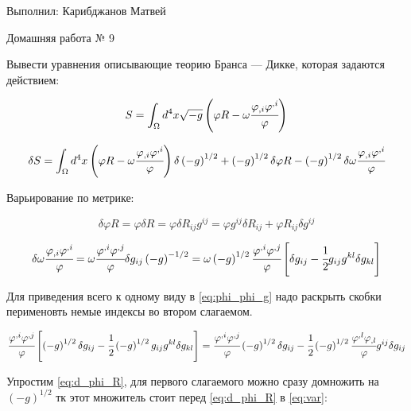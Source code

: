 \documentclass[a4paper]{article}
\newcommand{\inner}[1]{\left( #1 \right)}
\newcommand{\insqr}[1]{\left[ #1 \right]}
\renewcommand{\phi}{\varphi}
\numberwithin{equation}{section}
\begin{document}
\begin{flushright}
    Выполнил:
    Карибджанов Матвей

    Домашняя работа № 9
\end{flushright}
\pagestyle{main}

Вывести уравнения описывающие теорию Бранса — Дикке, которая задаются действием:

\begin{eqnarray}
    S = \int_\Omega d^4 x \sqrt{-g} \inner{\phi R - \omega \cfrac{\phi_{,i}\phi^{,i}}{\phi}} 
\end{eqnarray}

\begin{eqnarray}
    \label{eq:var}
    \delta S = \int_\Omega d^4 x \inner{\phi R - \omega \cfrac{\phi_{,i}\phi^{,i}}{\phi}}  \delta \inner{-g}^{1/2}
    + \inner{-g}^{1/2} \delta \phi R 
    - \inner{-g}^{1/2} \delta\omega \cfrac{\phi_{,i}\phi^{,i}}{\phi}
\end{eqnarray}

Варьирование по метрике:

\begin{equation}
    \label{eq:d_phi_R}
    \delta \phi R = \phi \delta R = \phi \delta R_{ij} g^{ij} 
    = \phi g^{ij} \delta R_{ij}  + \phi R_{ij} \delta g^{ij}
\end{equation}

\begin{equation}
    \label{eq:phi_phi_g}
    \delta\omega \cfrac{\phi_{,i}\phi^{,i}}{\phi} 
    = \omega \cfrac{\phi^{,i}\phi^{,j}}{\phi} \delta g_{ij} \inner{-g}^{-1/2}
    = \omega \inner{-g}^{1/2} \cfrac{\phi^{,i}\phi^{,j}}{\phi} \insqr{ \delta g_{ij} 
    - \cfrac{1}{2} g_{ij} g^{kl} \delta g_{kl}}
\end{equation}

Для приведения всего к одному виду в \ref{eq:phi_phi_g} надо раскрыть скобки 
перименовть немые индексы во втором слагаемом.

\begin{equation}
    \cfrac{\phi^{,i}\phi^{,j}}{\phi} \insqr{\inner{-g}^{1/2} \delta g_{ij} 
    - \cfrac{1}{2} \inner{-g}^{1/2} g_{ij} g^{kl} \delta g_{kl}} 
    = \cfrac{\phi^{,i}\phi^{,j}}{\phi} \inner{-g}^{1/2} \delta g_{ij} 
    - \cfrac{1}{2} \inner{-g}^{1/2} \cfrac{\phi^{,l}\phi_{,l}}{\phi} g^{ij} \delta g_{ij}
\end{equation}

Упростим \ref{eq:d_phi_R}, для первого слагаемого можно 
сразу домножить на $\inner{-g}^{1/2}$ тк этот множитель стоит перед \ref{eq:d_phi_R} в \ref{eq:var}:
\end{document}
